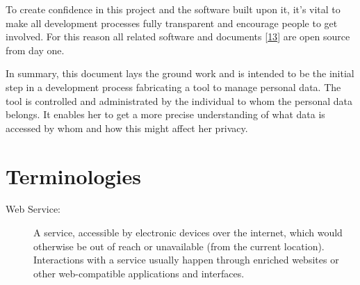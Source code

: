 \documentclass[12pt,english,a4paper,titlepage,cleardoublepage=empty,dottedtoc]{report}
\begin{document}
To create confidence in this project and the software built upon it,
it's vital to make all development processes fully transparent and
encourage people to get involved. For this reason all related software
and documents {[}\protect\hyperlink{ref-repo_2016_reflowd-spec}{13}{]}
are open source from day one.

In summary, this document lays the ground work and is intended to be the
initial step in a development process fabricating a tool to manage
personal data. The tool is controlled and administrated by the
individual to whom the personal data belongs. It enables her to get a
more precise understanding of what data is accessed by whom and how this
might affect her privacy.

\hypertarget{terminologies}{\section{Terminologies}\label{terminologies}}

\begin{description}
\item[Web Service:]
A service, accessible by electronic devices over the internet, which
would otherwise be out of reach or unavailable (from the current
location). Interactions with a service usually happen through enriched
websites or other web-compatible applications and interfaces.
\end{description}

~\\
\end{document}
